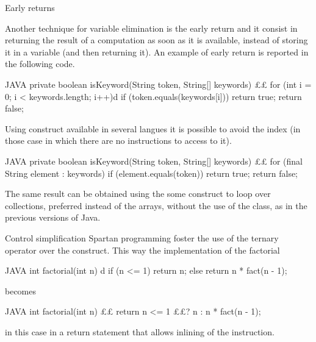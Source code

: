\begin{description}
\item{Early returns}

Another technique for variable elimination is the early return and it consist
in returning the result of a computation as soon as it is available, instead of
storing it in a variable (and then returning it). An example of early return
is reported in the following code.

\begin{code}{JAVA}
private boolean isKeyword(String token, String[] keywords) {££
    for (int i = 0; i < keywords.length; i++)d
        if (token.equals(keywords[i]))
            return true;
    return false;
}
\end{code}

Using  construct available in several langues it is possible to
avoid the index (in those case in which there are no instructions to access to
it).
\begin{code}{JAVA}
private boolean isKeyword(String token, String[] keywords) {££
    for (final String element : keywords)
        if (element.equals(token))
            return true;
    return false;
}
\end{code}
The same result can be obtained using the some construct to loop over
collections, preferred instead of the arrays, without the use of the
 class, as in the previous versions of Java.


\item{Control simplification}
Spartan programming foster the use of the ternary operator over the
 construct. This way the implementation of the factorial
\begin{code}{JAVA}
int factorial(int n) {d
    if (n <= 1)
        return n;
    else
        return n * fact(n - 1);
}
\end{code}
becomes
\begin{code}{JAVA}
int factorial(int n) {££
  return n <= 1 ££? n : n * fact(n - 1);
}
\end{code}
in this case in a return statement that allows inlining of the instruction.


\end{description}
